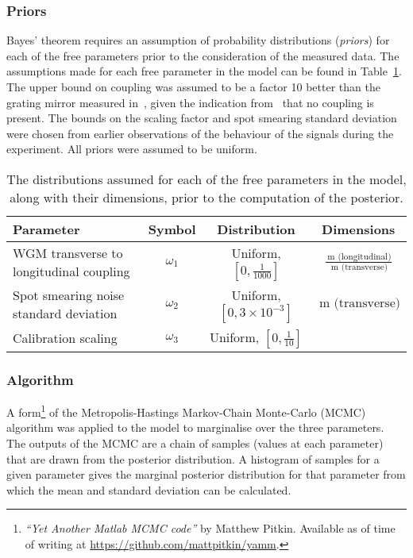 \subsubsection{Priors}
Bayes' theorem requires an assumption of probability distributions (\emph{priors}) for each of the free parameters prior to the consideration of the measured data. The assumptions made for each free parameter in the model can be found in Table~\ref{tab:priors}. The upper bound on coupling was assumed to be a factor \num{10} better than the grating mirror measured in~\cite{Barr2011}, given the indication from~\cite{Brown2013} that no coupling is present. The bounds on the scaling factor and spot smearing standard deviation were chosen from earlier observations of the behaviour of the signals during the experiment. All priors were assumed to be uniform.

\begin{table}
  \centering
  \begin{tabular}{|p{3cm}|c|c|c|}
    \hline
    \textbf{Parameter}   & \textbf{Symbol}     & \textbf{Distribution} & \textbf{Dimensions} \\ \hline
    \gls{WGM} transverse to longitudinal coupling & $\omega_1$ & Uniform, $\left[ 0, \frac{1}{1000} \right]$ & $\frac{\SI{}{\meter} \text{ (longitudinal)}}{\SI{}{\meter} \text{ (transverse)}}$ \\ \hline
    Spot smearing noise standard deviation & $\omega_2$ & Uniform, $\left[ 0, 3 \times 10^{-3} \right]$ & $\SI{}{\meter} \text{ (transverse)}$ \\ \hline
    Calibration scaling                    & $\omega_3$ & Uniform, $\left[ 0, \frac{1}{10} \right]$ &  \\ \hline
  \end{tabular}
  \caption{\label{tab:priors}The distributions assumed for each of the free parameters in the model, along with their dimensions, prior to the computation of the posterior.}
\end{table}

\subsubsection{Algorithm}
A form\footnote{\emph{``Yet Another Matlab MCMC code''} by Matthew Pitkin. Available as of time of writing at \url{https://github.com/mattpitkin/yamm}.} of the Metropolis-Hastings Markov-Chain Monte-Carlo (MCMC) algorithm \cite{Hastings1970} was applied to the model to marginalise over the three parameters. The outputs of the MCMC are a chain of samples (values at each parameter) that are drawn from the posterior distribution. A histogram of samples for a given parameter gives the marginal posterior distribution for that parameter from which the mean and standard deviation can be calculated.


